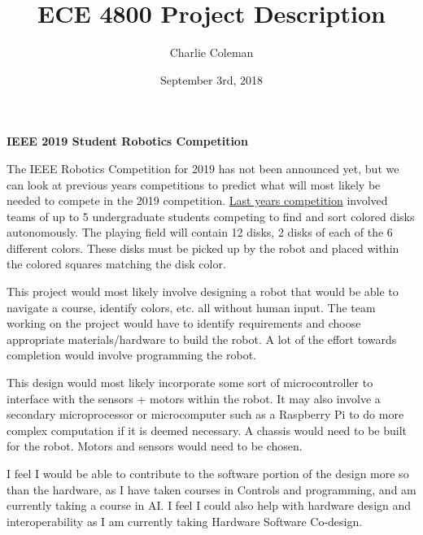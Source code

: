\documentclass{article}
\title{ECE 4800 Project Description}
\author{Charlie Coleman}
\date{September 3rd, 2018}
\begin{document}
	
	\maketitle
	
	\noindent\textbf{IEEE 2019 Student Robotics Competition}
	
	The IEEE Robotics Competition for 2019 has not been announced yet, but we can look at previous years competitions to predict what will most likely be needed to compete in the 2019 competition. \href{http://r5conferences.org/competitions/robotics-competition/}{Last years competition} involved teams of up to 5 undergraduate students competing to find and sort colored disks autonomously. The playing field will contain 12 disks, 2 disks of each of the 6 different colors. These disks must be picked up by the robot and placed within the colored squares matching the disk color.
	
	This project would most likely involve designing a robot that would be able to navigate a course, identify colors, etc. all without human input. The team working on the project would have to identify requirements and choose appropriate materials/hardware to build the robot. A lot of the effort towards completion would involve programming the robot.
	
	This design would most likely incorporate some sort of microcontroller to interface with the sensors + motors within the robot. It may also involve a secondary microprocessor or microcomputer such as a Raspberry Pi to do more complex computation if it is deemed necessary. A chassis would need to be built for the robot. Motors and sensors would need to be chosen.
	
	I feel I would be able to contribute to the software portion of the design more so than the hardware, as I have taken courses in Controls and programming, and am currently taking a course in AI. I feel I could also help with hardware design and interoperability as I am currently taking Hardware Software Co-design. 
	
\end{document}
